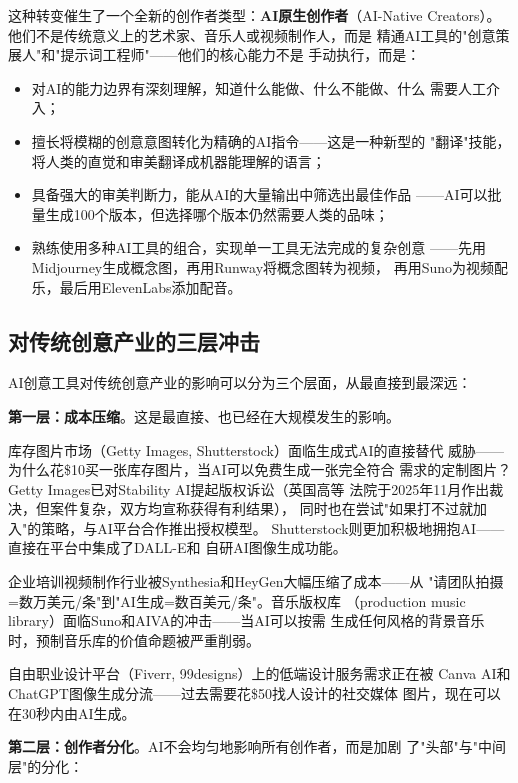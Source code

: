 这种转变催生了一个全新的创作者类型：\textbf{AI原生创作者}（AI-Native
Creators）。他们不是传统意义上的艺术家、音乐人或视频制作人，而是
精通AI工具的"创意策展人"和"提示词工程师"——他们的核心能力不是
手动执行，而是：
\begin{itemize}
  \item 对AI的能力边界有深刻理解，知道什么能做、什么不能做、什么
    需要人工介入；
  \item 擅长将模糊的创意意图转化为精确的AI指令——这是一种新型的
    "翻译"技能，将人类的直觉和审美翻译成机器能理解的语言；
  \item 具备强大的审美判断力，能从AI的大量输出中筛选出最佳作品
    ——AI可以批量生成100个版本，但选择哪个版本仍然需要人类的品味；
  \item 熟练使用多种AI工具的组合，实现单一工具无法完成的复杂创意
    ——先用Midjourney生成概念图，再用Runway将概念图转为视频，
    再用Suno为视频配乐，最后用ElevenLabs添加配音。
\end{itemize}

\subsection{对传统创意产业的三层冲击}
\label{subsec:create-disruption}

AI创意工具对传统创意产业的影响可以分为三个层面，从最直接到最深远：

\textbf{第一层：成本压缩}。这是最直接、也已经在大规模发生的影响。

库存图片市场（Getty Images, Shutterstock）面临生成式AI的直接替代
威胁——为什么花\$10买一张库存图片，当AI可以免费生成一张完全符合
需求的定制图片？Getty Images已对Stability AI提起版权诉讼（英国高等
法院于2025年11月作出裁决，但案件复杂，双方均宣称获得有利结果），
同时也在尝试"如果打不过就加入"的策略，与AI平台合作推出授权模型。
Shutterstock则更加积极地拥抱AI——直接在平台中集成了DALL-E和
自研AI图像生成功能。

企业培训视频制作行业被Synthesia和HeyGen大幅压缩了成本——从
"请团队拍摄=数万美元/条"到"AI生成=数百美元/条"。音乐版权库
（production music library）面临Suno和AIVA的冲击——当AI可以按需
生成任何风格的背景音乐时，预制音乐库的价值命题被严重削弱。

自由职业设计平台（Fiverr, 99designs）上的低端设计服务需求正在被
Canva AI和ChatGPT图像生成分流——过去需要花\$50找人设计的社交媒体
图片，现在可以在30秒内由AI生成。

\textbf{第二层：创作者分化}。AI不会均匀地影响所有创作者，而是加剧
了"头部"与"中间层"的分化：

